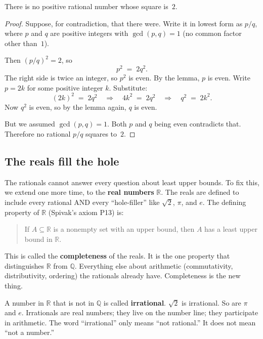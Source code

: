 \begin{theorem}
There is no positive rational number whose square is~$2$.
\end{theorem}

\begin{proof}
Suppose, for contradiction, that there were. Write it in lowest form as $p/q$, where $p$ and $q$ are positive integers with $\gcd(p, q) = 1$ (no common factor other than~$1$).

Then $(p/q)^2 = 2$, so
\[
  p^2 \;=\; 2q^2.
\]
The right side is twice an integer, so $p^2$ is even. By the lemma, $p$ is even. Write $p = 2k$ for some positive integer $k$. Substitute:
\[
  (2k)^2 \;=\; 2q^2 \quad\Rightarrow\quad 4k^2 \;=\; 2q^2 \quad\Rightarrow\quad q^2 \;=\; 2k^2.
\]
Now $q^2$ is even, so by the lemma again, $q$ is even.

But we assumed $\gcd(p, q) = 1$. Both $p$ and $q$ being even contradicts that. Therefore no rational $p/q$ squares to~$2$.
\end{proof}

\subsection*{The reals fill the hole}

The rationals cannot answer every question about least upper bounds. To fix this, we extend one more time, to the \textbf{real numbers} $\mathbb{R}$. The reals are defined to include every rational AND every ``hole-filler'' like $\sqrt{2}$, $\pi$, and $e$. The defining property of $\mathbb{R}$ (Spivak's axiom P13) is:

\begin{quote}
If $A \subseteq \mathbb{R}$ is a nonempty set with an upper bound, then $A$ has a least upper bound in $\mathbb{R}$.
\end{quote}

This is called the \textbf{completeness} of the reals. It is the one property that distinguishes $\mathbb{R}$ from $\mathbb{Q}$. Everything else about arithmetic (commutativity, distributivity, ordering) the rationals already have. Completeness is the new thing.

A number in $\mathbb{R}$ that is not in $\mathbb{Q}$ is called \textbf{irrational}. $\sqrt{2}$ is irrational. So are $\pi$ and $e$. Irrationals are real numbers; they live on the number line; they participate in arithmetic. The word ``irrational'' only means ``not rational.'' It does not mean ``not a number.''

